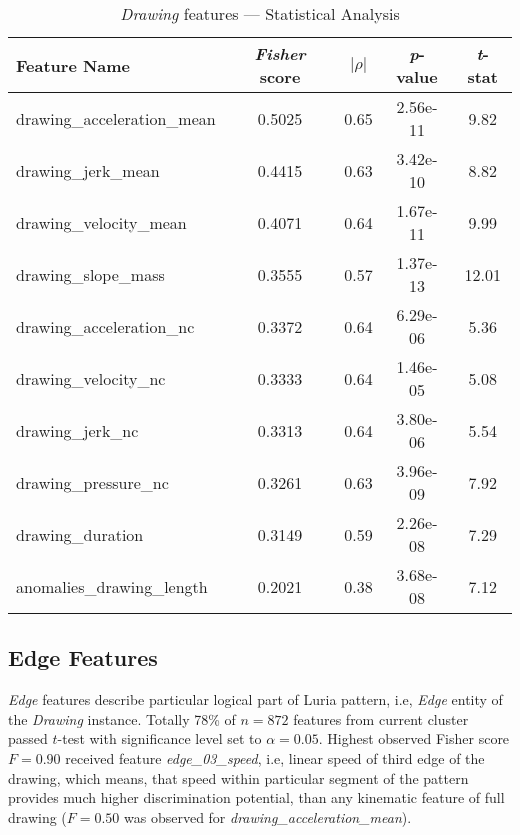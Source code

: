 
\begin{table}[htb]
    \centering
    \begin{tabular}
        {l*{1}{S[table-format=1.4]}
        *{1}{S[table-format=1.2]}
        *{1}{S[table-format=1.2e-2]}
        *{1}{S[table-format=-2.2]}}
        
    \toprule
    Feature Name &  {\textit{Fisher} score} & {$|\rho|$} & {\textit{p}-value} &  {\textit{t}-stat} \\
    \midrule
  drawing\_acceleration\_mean &  0.5025 &  0.65 &  2.56e-11 &   9.82 \\
          drawing\_jerk\_mean &  0.4415 &  0.63 &  3.42e-10 &   8.82 \\
      drawing\_velocity\_mean &  0.4071 &  0.64 &  1.67e-11 &   9.99 \\
         drawing\_slope\_mass &  0.3555 &  0.57 &  1.37e-13 &  12.01 \\
    drawing\_acceleration\_nc &  0.3372 &  0.64 &  6.29e-06 &   5.36 \\
        drawing\_velocity\_nc &  0.3333 &  0.64 &  1.46e-05 &   5.08 \\
            drawing\_jerk\_nc &  0.3313 &  0.64 &  3.80e-06 &   5.54 \\
        drawing\_pressure\_nc &  0.3261 &  0.63 &  3.96e-09 &   7.92 \\
          drawing\_duration &  0.3149 &  0.59 &  2.26e-08 &   7.29 \\
  anomalies\_drawing\_length &  0.2021 &  0.38 &  3.68e-08 &   7.12 \\
    \bottomrule
    \end{tabular}
    \caption{\textit{Drawing} features --- Statistical Analysis}\label{stat-drawing}
\end{table}

\subsection{Edge Features}

\textit{Edge} features describe particular logical part of Luria pattern, i.e, \textit{Edge} entity of the \textit{Drawing} instance. Totally 78\% of $n=872$ features from current cluster passed $t$-test with significance level set to $\alpha = 0.05$. 
Highest observed Fisher score $F=0.90$ received feature \textit{edge\_03\_speed}, i.e, linear speed of third edge of the drawing, which means, that speed within particular segment of the pattern provides much higher discrimination potential, than any kinematic feature of full drawing ($F=0.50$ was observed for \textit{drawing\_acceleration\_mean}). 

